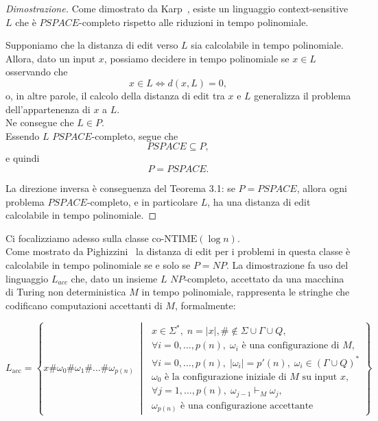 \documentclass[a4paper,12pt]{report}
\theoremstyle{propositionstyle}
\begin{document}
    \begin{proof}[Dimostrazione]
        Come dimostrato da Karp~\cite{Karp-1}, esiste un linguaggio context-sensitive \(L\) che è \(PSPACE\)-completo rispetto alle riduzioni in tempo polinomiale.

        Supponiamo che la distanza di edit verso \(L\) sia calcolabile in tempo polinomiale.
        Allora, dato un input \(x\), possiamo decidere in tempo polinomiale se \(x \in L\) osservando che
        \[
            x \in L \iff d(x,L) = 0,
        \]
        o, in altre parole, il calcolo della distanza di edit tra \(x\) e \(L\) generalizza il problema dell’appartenenza di \(x\) a \(L\). \\
        Ne consegue che \(L \in P\). \\
        Essendo \(L\) \(PSPACE\)-completo, segue che
        \[
            PSPACE \subseteq P,
        \]
        e quindi
        \[
            P = PSPACE.
        \]


        La direzione inversa è conseguenza del Teorema 3.1: se \(P = PSPACE\), allora ogni problema \(PSPACE\)-completo, e in particolare \(L\), ha una distanza di edit calcolabile in tempo polinomiale.
    \end{proof}

    Ci focalizziamo adesso sulla classe $\text{co-NTIME}(\log n)$. \\
    Come mostrato da Pighizzini~\cite{pighizzini} la distanza di edit per i problemi in questa classe è calcolabile in tempo polinomiale se e solo se $P = NP$.
    La dimostrazione fa uso del linguaggio $L_{acc}$ che, dato un insieme $L$ $NP$-completo, accettato da una macchina di Turing non deterministica $M$ in tempo polinomiale,
    rappresenta le stringhe che codificano computazioni accettanti di $M$, formalmente:

    \[
        L_{\text{acc}} = \left\{
                             x \# \omega_0 \# \omega_1 \# \dots \# \omega_{p(n)}
                             \;\middle|\;
                             \begin{array}{l}
                                 x \in \Sigma^*,\; n = |x|, \# \notin \Sigma \cup \Gamma \cup Q, \\[4pt]
                                 \forall i = 0,\dots,p(n),\; \omega_i \text{ è una configurazione di } M, \\[4pt]
                                 \forall i = 0,\dots,p(n),\; \lvert \omega_i \rvert = p'(n), \; \omega_i \in \left(\Gamma \cup Q \right)^* \\[4pt]
                                 \omega_0 \text{ è la configurazione iniziale di } M \text{ su input } x, \\[4pt]
                                 \forall j = 1, \dots, p(n),\; \omega_{j-1} \vdash_M \omega_j, \\[4pt]
                                 \omega_{p(n)} \text{ è una configurazione accettante}
                             \end{array}
        \right\}
    \]
\end{document}
